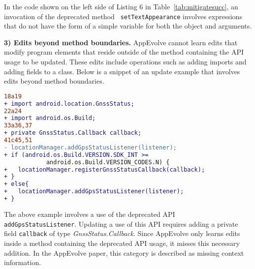 In the code shown on the left side of Listing 6 in
Table~\ref{tab:mitigatesucc}, an invocation of the deprecated method {\tt
setTextAppearance} involves expressions that do not have the form
of a simple variable for both the object and arguments.

\vspace{0.25\baselineskip}\noindent\textbf{3) Edits beyond method boundaries.} AppEvolve cannot learn edits that modify program elements that reside outside of the method containing the API usage to be updated. These edits include operations such as adding imports and adding fields to a class. Below is a snippet of an update example that involves edits beyond method boundaries.
\begin{lstlisting}[language=diff,numbers=none]
18a19
+ import android.location.GnssStatus;
22a24
+ import android.os.Build;
33a36,37
+ private GnssStatus.Callback callback;
41c45,51
- locationManager.addGpsStatusListener(listener);
+ if (android.os.Build.VERSION.SDK_INT >=
            android.os.Build.VERSION_CODES.N) {
+   locationManager.registerGnssStatusCallback(callback);
+ }
+ else{
+   locationManager.addGpsStatusListener(listener);
+ }
\end{lstlisting}
The above example involves a use of the deprecated API {\tt
addGpsStatusListener}. Updating a use of this API requires adding a private
field {\tt callback} of type {\em GnssStatus.Callback}.
Since AppEvolve only learns edits inside a method containing the deprecated
API usage, it misses this necessary addition.  In the AppEvolve paper, this
category is described as missing context information.

